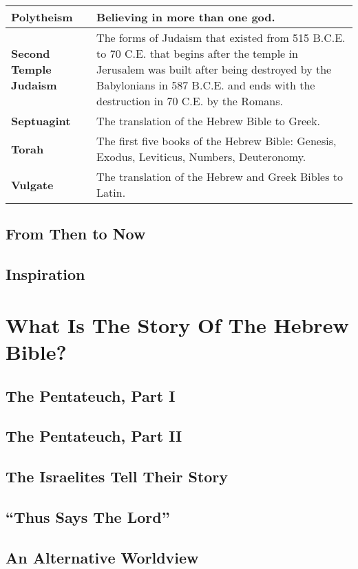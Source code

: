 \documentclass{report}
\begin{document}
\begin{center}
\begin{longtable}{| p{5cm} | p{7cm} |}
            \textbf{Polytheism} & Believing in more than one god.\\ \hline
            \textbf{Second Temple Judaism} & The forms of Judaism that existed from 515 B.C.E. to 70 C.E. that begins after the temple in Jerusalem was built after being destroyed by the Babylonians in 587 B.C.E. and ends with the destruction in 70 C.E. by the Romans.\\ \hline
            \textbf{Septuagint} & The translation of the Hebrew Bible to Greek.\\ \hline
            \textbf{Torah} & The first five books of the Hebrew Bible: Genesis, Exodus, Leviticus, Numbers, Deuteronomy.\\ \hline
            \textbf{Vulgate} & The translation of the Hebrew and Greek Bibles to Latin.\\ \hline
        \end{longtable}
        \end{center}
    \chapter{From Then to Now}
    \chapter{Inspiration}

\part{What Is The Story Of The Hebrew Bible?}

    \chapter{The Pentateuch, Part I}
    \chapter{The Pentateuch, Part II}
    \chapter{The Israelites Tell Their Story}
    \chapter{``Thus Says The Lord''}
    \chapter{An Alternative Worldview}
\end{document}
